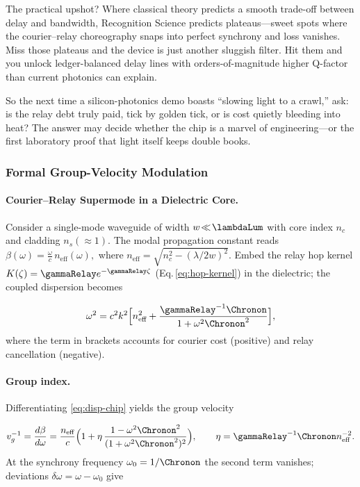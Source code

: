 \documentclass[11pt,oneside]{book}
\begin{document}
{The practical upshot?  
Where classical theory predicts a smooth trade-off between delay and
bandwidth, Recognition Science predicts plateaus—sweet spots where the
courier–relay choreography snaps into perfect synchrony and loss
vanishes.  Miss those plateaus and the device is just another sluggish
filter.  Hit them and you unlock ledger-balanced delay lines with
orders-of-magnitude higher Q-factor than current photonics can
explain.

So the next time a silicon-photonics demo boasts “slowing light to a
crawl,” ask: is the relay debt truly paid, tick by golden tick, or is
cost quietly bleeding into heat?  The answer may decide whether the
chip is a marvel of engineering—or the first laboratory proof that
light itself keeps double books.


\subsubsection*{Formal Group-Velocity Modulation}

\paragraph{Courier–Relay Supermode in a Dielectric Core.}
Consider a single-mode waveguide of width
\(w\!\ll\!\lambdaLum\) with core index \(n_{c}\) and cladding
\(n_{s}\!(\approx1)\).
The modal propagation constant reads
\(
   \beta(\omega)=\tfrac{\omega}{c}\,n_{\text{eff}}(\omega),
\)
where
\(n_{\text{eff}}=\sqrt{n_{c}^{2}-(\lambda/2w)^{2}}\).
Embed the relay hop kernel
\(K(\zeta)=\gammaRelay e^{-\gammaRelay\zeta}\)
(Eq.\,\ref{eq:hop-kernel}) in the dielectric; the coupled dispersion
becomes

\[
   \omega^{2}
   =
   c^{2}k^{2}
   \Bigl[
      n_{\text{eff}}^{2}
      + \frac{\gammaRelay^{-1}\Chronon}{1+\omega^{2}\Chronon^{2}}
   \Bigr],
   \label{eq:disp-chip}
\]
where the term in brackets accounts for courier cost (positive) and
relay cancellation (negative).

\paragraph{Group index.}
Differentiating \eqref{eq:disp-chip} yields the group velocity

\[
   v_{g}^{-1}
   =
   \frac{d\beta}{d\omega}
   =
   \frac{n_{\text{eff}}}{c}
   \Bigl(
      1 + \eta\,\frac{1-\omega^{2}\Chronon^{2}}
                     {(1+\omega^{2}\Chronon^{2})^{2}}
   \Bigr),
   \qquad
   \eta=\gammaRelay^{-1}\Chronon n_{\text{eff}}^{-2}.
\]
At the synchrony frequency
\(\omega_{0}=1/\Chronon\)
the second term vanishes; deviations
\(\delta\omega=\omega-\omega_{0}\) give

}
\end{document}
